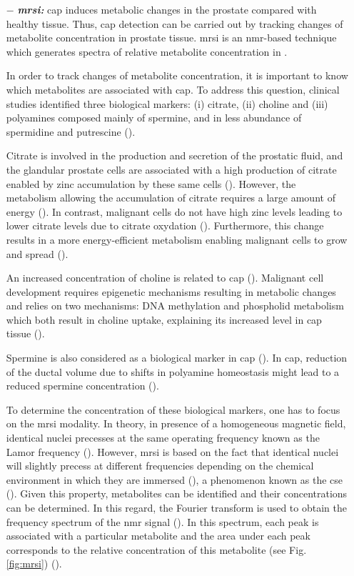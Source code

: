 \begin{enumerate}[leftmargin=*]
\item[$-$] \textbf{\textit{\ac{mrsi}:}} \ac{cap} induces metabolic changes in the prostate compared with healthy tissue. Thus, \ac{cap} detection can be carried out by tracking changes of metabolite concentration in prostate tissue. \ac{mrsi} is an \ac{nmr}-based technique which generates spectra of relative metabolite concentration in .

In order to track changes of metabolite concentration, it is important to know which metabolites are associated with \ac{cap}. To address this question, clinical studies identified three biological markers: (i) citrate, (ii) choline and (iii) polyamines composed mainly of spermine, and in less abundance of spermidine and putrescine (\cite{Awwad2012,Costello2006,Giskeodegard2013}). 

Citrate is involved in the production and secretion of the prostatic fluid, and the glandular prostate cells are associated with a high production of citrate enabled by zinc accumulation by these same cells (\cite{Costello2006}). However, the metabolism allowing the accumulation of citrate requires a large amount of energy (\cite{Costello2006}). In contrast, malignant cells do not have high zinc levels leading to lower citrate levels due to citrate oxydation (\cite{Costello2006}). Furthermore, this change results in a more energy-efficient metabolism enabling malignant cells to grow and spread (\cite{Costello2006}).

An increased concentration of choline is related to \ac{cap} (\cite{Awwad2012}). Malignant cell development requires epigenetic mechanisms resulting in metabolic changes and relies on two mechanisms: DNA methylation and phospholid metabolism which both result in choline uptake, explaining its increased level in \ac{cap} tissue (\cite{Awwad2012}).

Spermine is also considered as a biological marker in \ac{cap} (\cite{Graaf2000,Giskeodegard2013}). In \ac{cap}, reduction of the ductal volume due to shifts in polyamine homeostasis might lead to a reduced spermine concentration (\cite{Graaf2000}).

To determine the concentration of these biological markers, one has to focus on the \ac{mrsi} modality. In theory, in presence of a homogeneous magnetic field, identical nuclei precesses at the same operating frequency known as the Lamor frequency (\cite{Haacke1999}). However, \ac{mrsi} is based on the fact that identical nuclei will slightly precess at different frequencies depending on the chemical environment in which they are immersed (\cite{Haacke1999}), a phenomenon known as the \ac{cse} (\cite{Parfait2010}). Given this property, metabolites can be identified and their concentrations can be determined. In this regard, the Fourier transform is used to obtain the frequency spectrum of the \ac{nmr} signal (\cite{Haacke1999,Parfait2010}). In this spectrum, each peak is associated with a particular metabolite and the area under each peak corresponds to the relative concentration of this metabolite (see Fig. \ref{fig:mrsi}) (\cite{Parfait2010}).


\end{enumerate}
